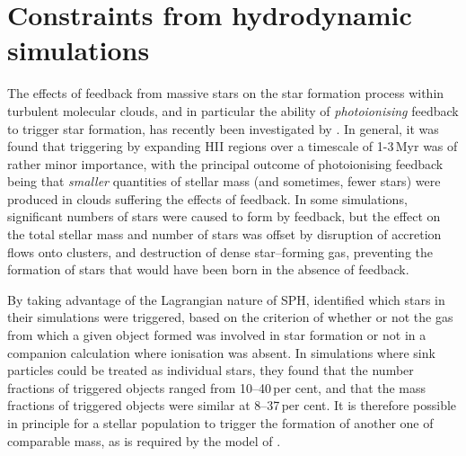 \documentclass[useAMS,usenatbib,usegraphicx]{mn2e}
\begin{document}
\section{Constraints from hydrodynamic simulations}
\label{trigger}

The effects of feedback from massive stars on the star formation process within turbulent molecular clouds, and in particular the ability of \emph{photoionising} feedback to trigger star formation, has recently been investigated by \cite{Dale13b}. In general, it was found that triggering by expanding H{\small II} regions over a timescale of 1-3\,Myr was of rather minor importance, with the principal outcome of photoionising feedback being that \emph{smaller} quantities of stellar mass (and sometimes, fewer stars) were produced in clouds suffering the effects of feedback. In some simulations, significant numbers of stars were caused to form by feedback, but the effect on the total stellar mass and number of stars was offset by disruption of accretion flows onto clusters, and destruction of dense star--forming gas, preventing the formation of stars that would have been born in the absence of feedback.

By taking advantage of the Lagrangian nature of SPH, \cite{Dale13b} identified which stars in their simulations were triggered, based on the criterion of whether or not the gas from which a given object formed was involved in star formation or not in a companion calculation where ionisation was absent. In simulations where sink particles could be treated as individual stars, they found that the number fractions of triggered objects ranged from 10--40\,per cent, and that the mass fractions of triggered objects were similar at 8--37\,per cent. It is therefore possible in principle for a stellar population to trigger the formation of another one of comparable mass, as is required by the model of \citet{Gounelle12}.
\end{document}
